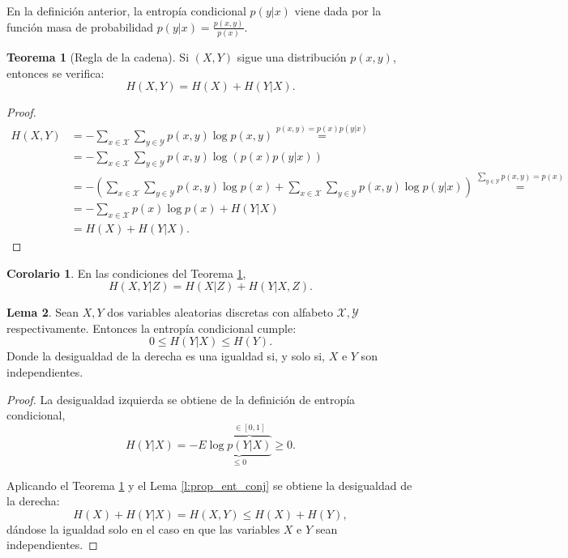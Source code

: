 \documentclass[10pt,a4paper]{article} %
\theoremstyle{definition}
\newtheorem{theorem}{Teorema}[section]
\newtheorem{lemma}[theorem]{Lema}
\newtheorem{corollary}{Corolario}[theorem]
\begin{document}
En la definición anterior, la entropía condicional $p(y|x)$ viene dada por la función masa de probabilidad $p(y|x) = \frac{p(x,y)}{p(x)}$.

\begin{theorem}[Regla de la cadena]\label{t:regla_cadena}
  Si $(X,Y)$ sigue una distribución $p(x,y)$, entonces se verifica:\[
H(X,Y) = H(X) + H(Y|X).
  \]
\end{theorem}

\begin{proof}
  \begin{align*}
    H(X,Y) &= - \sum_{x \in \mathcal{X}} \sum_{y \in \mathcal{Y}} p(x,y) \log p(x,y) \stackrel{p(x,y) = p(x)p(y|x)}{=}\\
    &= - \sum_{x \in \mathcal{X}} \sum_{y \in \mathcal{Y}} p(x,y) \log \left( p(x)p(y|x) \right )\\
    &= - \left(\sum_{x \in \mathcal{X}} \sum_{y \in \mathcal{Y}} p(x,y) \log p(x) + \sum_{x \in \mathcal{X}} \sum_{y \in \mathcal{Y}} p(x,y) \log p(y|x) \right )\stackrel{\sum_{y\in \mathcal{Y}}p(x,y) = p(x)}{=}\\
    &= - \sum_{x \in \mathcal{X}} p(x) \log p(x) + H(Y|X)\\
    &= H(X) + H(Y|X).
  \end{align*}
\end{proof}

\begin{corollary} En las condiciones del Teorema \ref{t:regla_cadena},\[
H(X,Y|Z) = H(X|Z) + H(Y|X, Z).
  \]
\end{corollary}

\begin{lemma}
  Sean $X, Y$ dos variables aleatorias discretas con alfabeto $\mathcal{X}, \mathcal{Y}$ respectivamente. Entonces la entropía condicional cumple:\[
0 \leq H(Y|X) \leq H(Y).
\]
Donde la desigualdad de la derecha es una igualdad si, y solo si, $X$ e $Y$ son independientes.
\end{lemma}

\begin{proof}
  La desigualdad izquierda se obtiene de la definición de entropía condicional, \[H(Y|X) = - E \underbrace{\log \overbrace{p(Y|X)}^{\in [0,1]}}_{\leq 0} \ge 0.\]

  Aplicando el Teorema \ref{t:regla_cadena} y el Lema \ref{l:prop_ent_conj} se obtiene la desigualdad de la derecha:\[
H(X) + H(Y|X) = H(X,Y) \leq H(X) + H(Y),
\]
dándose la igualdad solo en el caso en que las variables $X$ e $Y$ sean independientes.
\end{proof}
\end{document}
